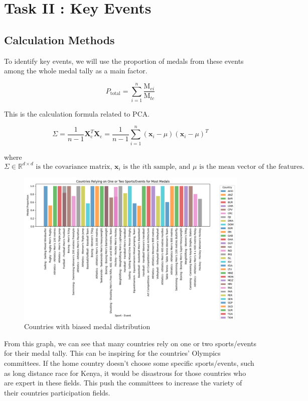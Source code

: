 \section{Task II : Key Events}
\subsection*{Calculation Methods}
To identify key events, we will use the proportion of medals from these events among the whole medal tally as a main factor.

\[
P_{\text{total}} = \sum_{i=1}^{n} \frac{\text{M}_{ei}}{\text{M}_{tc}}
\]

This is the calculation formula related to PCA.

\[
\Sigma = \frac{1}{n-1} \mathbf{X}_{\text{c}}^T \mathbf{X}_{\text{c}} = \frac{1}{n-1} \sum_{i=1}^{n} \left( \mathbf{x}_i - \mu \right) \left( \mathbf{x}_i - \mu \right)^T
\]

where
\[
\Sigma \in \mathbb{R}^{d \times d} \text{ is the covariance matrix, } \mathbf{x}_i \text{ is the } i\text{th sample, and } \mu \text{ is the mean vector of the features.}
\]

\begin{figure}[htbp]
    \centering
    \includegraphics[width=1\textwidth]{./figures/Key_event.png}
    \caption{ Countries with biased medal distribution}
    \label{fig:Key_event}
\end{figure}

From this graph, we can see that many countries rely on one or two sports/events for their medal tally. This can be inspiring for the countries' Olympics committees.
If the home country doesn't choose some specific sports/events, such as long distance race for Kenya, it would be disastrous for those countries who are expert in these fields.
This push the committees to increase the variety of their countries participation fields.

